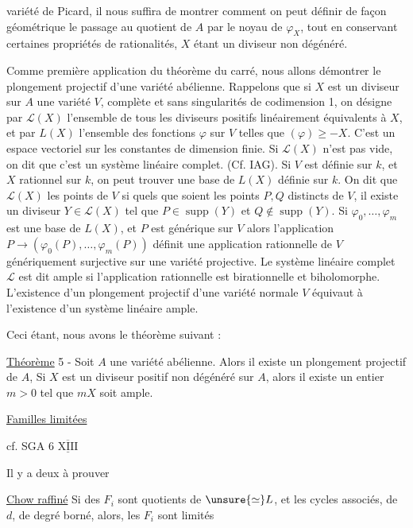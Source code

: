 variété de Picard, il nous suffira de montrer comment on peut définir de façon géométrique le passage au quotient de $A$ par le noyau de $\varphi_X$, tout en conservant certaines propriétés de rationalités, $X$ étant un diviseur non dégénéré.

Comme première application du théorème du carré, nous allons démontrer le plongement projectif d'une variété abélienne. Rappelons que si $X$ est un diviseur sur $A$ une variété $V$, complète et sans singularités de  codimension 1, on désigne par $\mathcal{L}(X)$ l'ensemble de tous les diviseurs positifs linéairement équivalents à $X$, et par $L(X)$ l'ensemble des fonctions $\varphi$ sur $V$ telles que $(\varphi)\geq-X$. C'est un espace vectoriel sur les constantes de dimension finie. Si $\mathcal{L}(X)$ n'est pas vide, on dit que c'est un système linéaire complet. (Cf. IAG). Si $V$ est définie sur $k$, et $X$ rationnel sur $k$, on peut trouver une base de $L(X)$ définie sur $k$.
On dit que $\mathcal{L}(X)$  les points de $V$ si quels que soient les points $P,Q$ distincts de $V$, il existe un diviseur $Y\in\mathcal{L}(X)$ tel que $P\in\operatorname{supp}(Y)$ et $Q\notin\operatorname{supp}(Y)$. Si $\varphi_0,\ldots,\varphi_m$ est une base de $L(X)$, et $P$ est générique sur $V$ alors l'application $P\longrightarrow(\varphi_0(P),\ldots,\varphi_m(P))$ définit une application rationnelle de $V$ génériquement surjective sur une variété projective. Le système linéaire complet $\mathcal{L}$ est dit ample si l'application rationnelle est birationnelle et biholomorphe. L'existence d'un plongement projectif d'une variété normale $V$ équivaut à l'existence d'un système linéaire ample.

Ceci étant, nous avons le théorème suivant :

\uline{Théorème} 5 - Soit $A$ une variété abélienne. Alors il existe un plongement projectif de $A$, Si $X$ est un diviseur positif non dégénéré sur $A$, alors il existe un entier $m>0$ tel que $mX$ soit ample.
\begin{flushright}
\uline{Familles limitées}

cf. SGA 6 $\overline{\underline{\mathrm{XIII}}}$
\end{flushright}
Il y a deux  à prouver

\uline{Chow raffiné} Si des $F_i$ sont quotients de  $\unsure{\simeq}L$, et  les cycles associés, de  $d$, de degré borné, alors, les $F_i$ sont limités

